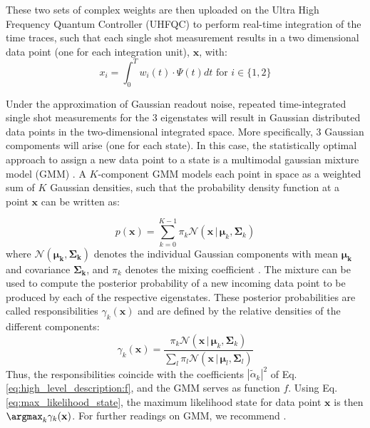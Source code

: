 These two sets of complex weights are then uploaded on the Ultra High Frequency Quantum Controller (UHFQC) to perform real-time integration of the time traces, such that each single shot measurement results in a two dimensional data point (one for each integration unit), $\mathbf{x}$, with:
\begin{equation} \label{eq:weighted_time_trace_integration}
    x_i = \int_{0}^{T}{w_{i}(t)\cdot \Psi(t)dt} \text{ for $i \in \{1,2\}$}
\end{equation}

Under the approximation of Gaussian readout noise, repeated time-integrated single shot measurements for the 3 eigenstates will result in Gaussian distributed data points in the two-dimensional integrated space. More specifically, 3 Gaussian compoments will arise (one for each state). In this case, the statistically optimal approach to assign a new data point to a state is a multimodal gaussian mixture model (GMM) \cite{Bishop2006}. A $K$-component GMM models each point in space as a weighted sum of $K$ Gaussian densities, such that the probability density function at a point $\mathbf{x}$ can be written as:

\begin{equation}
p(\mathbf{x})=\sum_{k=0}^{K-1} \pi_{k} \mathcal{N}\left(\mathbf{x}\, | \, \boldsymbol{\mu}_{k}, \mathbf{\Sigma}_{k}\right)
\end{equation}
where $\mathcal{N}(\mathbf{\mu_k,\Sigma_k})$ denotes the individual Gaussian components with mean $\mathbf{\mu_k}$ and covariance $\mathbf{\Sigma_k}$, and $\pi_k$ denotes the mixing coefficient \cite{Bishop2006}.
The mixture can be used to compute the posterior probability of a new incoming data point to be produced by  each of the respective eigenstates. These posterior probabilities are called responsibilities $\gamma_{k}(\mathbf{x}) $ and are defined by the relative densities of the different components:
\begin{equation}
\gamma_{k}(\mathbf{x}) =\frac{\pi_{k} \mathcal{N}\left(\mathbf{x}\, | \, \boldsymbol{\mu}_{k}, \mathbf{\Sigma}_{k}\right)}{\sum_{l} \pi_{l} \mathcal{N}\left(\mathbf{x}\, | \,\boldsymbol{\mu}_{l}, \mathbf{\Sigma}_{l}\right)}
\end{equation}
Thus, the responsibilities coincide with the coefficients $|\tilde{\alpha}_k|^2$ of Eq. \eqref{eq:high_level_description:f}, and the GMM serves as function $f$. Using Eq. \eqref{eq:max_likelihood_state}, the  maximum likelihood state for data point $\mathbf{x}$ is then 
 $\argmax_{k} \gamma_{k}(\mathbf{x})$. For further readings on GMM, we recommend \cite{Bishop2006, Hastie2017}. 

